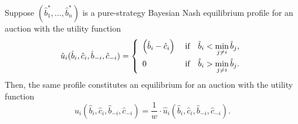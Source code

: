 \begin{propositiona}[\ref{prop:equivalence_of_utilities_indirect}]
Suppose $(\hat{b}_1^*, \ldots, \hat{b}_n^*)$ is a pure-strategy Bayesian Nash equilibrium profile for an auction with the utility function
\begin{equation}
  \hat{u}_i(\hat{b}_i,\hat{c}_i,\hat{b}_{-i},\hat{c}_{-i}) = \left\{
  \begin{array}{l l}
    \displaystyle\left(\hat{b}_i-\hat{c}_i\right) & \;\textrm{if}\quad\hat{b}_i < \displaystyle\min_{j\neq i}\hat{b}_j,\\[2ex]
    0 & \;\textrm{if}\quad\hat{b}_i > \displaystyle\min_{j\neq i}\hat{b}_j.
  \end{array}\right.
\end{equation}
Then, the same profile constitutes an equilibrium for an auction with the utility function
\begin{equation}
  u_i(\hat{b}_i,\hat{c}_i,\hat{b}_{-i},\hat{c}_{-i}) = \frac{1}{w}\cdot \hat{u}_i(\hat{b}_i,\hat{c}_i,\hat{b}_{-i},\hat{c}_{-i}).
\end{equation}
\end{propositiona}
